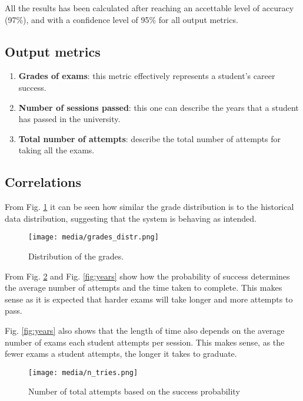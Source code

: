 \documentclass[conference]{IEEEtran}
\begin{document}
{    All the results has been calculated after reaching an accettable level of accuracy (97\%), and with a confidence level of 95\% for all output metrics.   

    \subsection{Output metrics}

    \begin{enumerate}
        \item \textbf{Grades of exams}: this metric effectively represents a student's career success. 
        \item \textbf{Number of sessions passed}: this one can describe the years that a student has passed in the university. 
        \item \textbf{Total number of attempts}: describe the total number of attempts for taking all the exams. 
    \end{enumerate}

    \subsection{Correlations}

    From Fig. \ref{fig:grade_distr} it can be seen how similar the grade distribution is to the historical data distribution, suggesting that the system is behaving as intended.


    \begin{center}
        \begin{figure}[h!]
          \centering
          \texttt{[image: media/grades\_distr.png]}
          \caption{Distribution of the grades.}
          \label{fig:grade_distr}
        \end{figure}
    \end{center}

    From Fig. \ref{fig:tries_distr} and Fig. \ref{fig:years} show how the probability of success determines the average number of attempts and the time taken to complete. This makes sense as it is expected that harder exams will take longer and more attempts to pass. 

    Fig. \ref{fig:years} also shows that the length of time also depends on the average number of exams each student attempts per session. This makes sense, as the fewer exams a student attempts, the longer it takes to graduate. 

    \begin{center}
        \begin{figure}[h!]
          \centering
          \texttt{[image: media/n\_tries.png]}
          \caption{Number of total attempts based on the success probability}
          \label{fig:tries_distr}
        \end{figure}
    \end{center}

}
\end{document}
